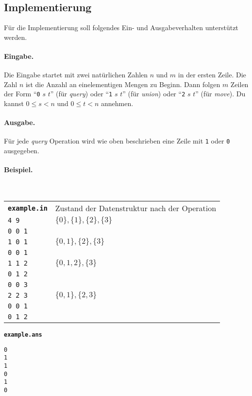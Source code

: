 \documentclass{uebung_cs}
\begin{document}
\begin{aufgabe}
  \appendix
  \section{Implementierung}\label{implementierung}
  Für die Implementierung soll folgendes Ein- und Ausgabeverhalten unterstützt werden.
  
	\paragraph{Eingabe.}
  Die Eingabe startet mit zwei natürlichen Zahlen $n$ und $m$ in der ersten Zeile.
  Die Zahl $n$ ist die Anzahl an einelementigen Mengen zu Beginn.
  Dann folgen $m$ Zeilen der Form
  \enquote{\texttt{0} $s$ $t$} (für \emph{query}) oder \enquote{\texttt{1} $s$ $t$} (für \emph{union}) oder \enquote{\texttt{2} $s$ $t$} (für \emph{move}).
  Du kannst $0\leq s< n$ und $0\leq t< n$ annehmen.

  \paragraph{Ausgabe.}  
  Für jede \emph{query} Operation wird wie oben beschrieben eine Zeile mit \texttt{1} oder \texttt{0} ausgegeben.
  
  \paragraph{Beispiel.}\mbox{}\\
  \begin{tabular}{ll}
  \texttt{\bfseries example.in}& Zustand der Datenstruktur nach der Operation\\[.5\baselineskip]
    \texttt{4 9}   & $\{0\}, \{1\}, \{2\},\{3\}$\\
    \texttt{0 0 1} \\
    \texttt{1 0 1} & $\{0, 1\}, \{2\},\{3\}$ \\
    \texttt{0 0 1} &\\
    \texttt{1 1 2} & $\{0, 1, 2\},\{3\}$ \\
    \texttt{0 1 2} &\\
    \texttt{0 0 3} &\\
    \texttt{2 2 3}   & $\{0, 1\}, \{2,3\}$ \\
    \texttt{0 0 1} &\\
    \texttt{0 1 2} &
  \end{tabular}
\hspace{2cm}
	\begin{minipage}{3cm}
		\texttt{\bfseries example.ans}
		\begin{verbatim}
0
1
1
0
1
0
\end{verbatim}
	\end{minipage}


\end{aufgabe}
\end{document}
